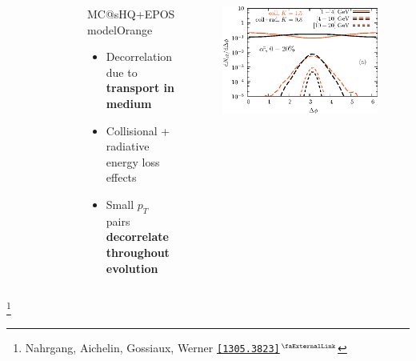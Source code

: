 \documentclass[aspectratio=169,11pt,usenames,dvipsnames]{beamer}
\renewcommand{\thefootnote}{\color{customblue}\faPaperPlaneO}
\newcommand\blfootnote[1]{%
  \begingroup
  \renewcommand\thefootnote{}\footnote{#1}%
  \addtocounter{footnote}{-1}%
  \endgroup
}
\begin{document}
\begin{frame}
\begin{center}
\begin{columns}[onlytextwidth,t]
\begin{figure}
            \end{figure}
            \begin{center}
                \begin{custombox2}{\normalsize MC@sHQ+EPOS model}{Orange}
                    \small
                    \begin{varwidth}{1.06\textwidth}
                    \begin{itemize}\itemsep0em 
                        \itemsep0em
                        \footnotesize
                        \item Decorrelation due to {\bfseries\color{Orange}transport in medium}
                        \item Collisional + radiative energy loss effects
                        \item Small $p_T$ pairs {\bfseries\color{Orange}decorrelate throughout evolution}
                    \end{itemize}
                    \end{varwidth}
                \end{custombox2}
            \end{center}
            \vspace{-10pt}
            \begin{figure}
                \centering
                \includegraphics[width=0.83\columnwidth]{images/deltaphi_cccor_centrala.eps}
            \end{figure}
        \end{columns}    
    \end{center}
    \vspace{-15pt}
    \blfootnote{\scriptsize Nahrgang, Aichelin, Gossiaux, Werner \href{https://arxiv.org/abs/1305.3823}{{\color{Orange}\texttt{[1305.3823]$^\text{\scalebox{0.9}{\faExternalLink}}$}}}}
\end{frame}
\end{document}
